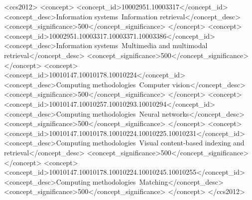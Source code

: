 \documentclass[sigconf]{acmart}
\begin{document}
\begin{CCSXML}
<ccs2012>
<concept>
<concept_id>10002951.10003317</concept_id>
<concept_desc>Information systems~Information retrieval</concept_desc>
<concept_significance>500</concept_significance>
</concept>
<concept>
<concept_id>10002951.10003317.10003371.10003386</concept_id>
<concept_desc>Information systems~Multimedia and multimodal retrieval</concept_desc>
<concept_significance>500</concept_significance>
</concept>
<concept>
<concept_id>10010147.10010178.10010224</concept_id>
<concept_desc>Computing methodologies~Computer vision</concept_desc>
<concept_significance>500</concept_significance>
</concept>
<concept>
<concept_id>10010147.10010257.10010293.10010294</concept_id>
<concept_desc>Computing methodologies~Neural networks</concept_desc>
<concept_significance>500</concept_significance>
</concept>
<concept>
<concept_id>10010147.10010178.10010224.10010225.10010231</concept_id>
<concept_desc>Computing methodologies~Visual content-based indexing and retrieval</concept_desc>
<concept_significance>500</concept_significance>
</concept>
<concept>
<concept_id>10010147.10010178.10010224.10010245.10010255</concept_id>
<concept_desc>Computing methodologies~Matching</concept_desc>
<concept_significance>500</concept_significance>
</concept>
</ccs2012>
\end{CCSXML}






\maketitle
\end{document}

